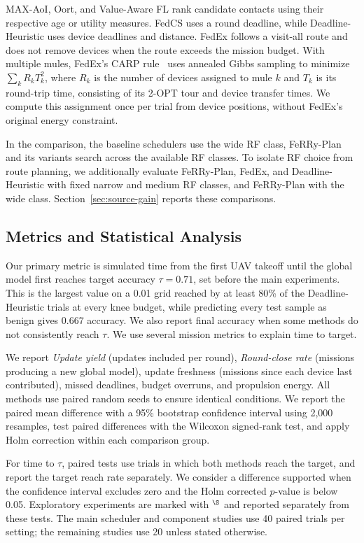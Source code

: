 \documentclass[conference]{IEEEtran}
\newcommand{\sysname}{FeRRy}
\begin{document}
MAX-AoI, Oort, and Value-Aware FL rank candidate
contacts using their respective age or utility measures. FedCS uses a round deadline, while Deadline-Heuristic uses device
deadlines and distance. FedEx follows a visit-all route
and does not remove devices when the route exceeds the mission budget. With multiple mules, FedEx's CARP
rule~\cite{bian2025indirect} uses annealed Gibbs sampling to minimize
\(\sum_k R_kT_k^2\), where \(R_k\) is the number of devices assigned to mule
\(k\) and \(T_k\) is its round-trip time, consisting of its 2-OPT tour and
device transfer times. We compute this assignment once per trial from
device positions, without FedEx's original energy
constraint.

In the comparison, the baseline schedulers use the wide RF class, \sysname{}-Plan and its variants search across the available RF
classes. To isolate RF choice from route planning, we additionally evaluate
\sysname{}-Plan, FedEx, and Deadline-Heuristic with fixed narrow and medium RF
classes, and \sysname{}-Plan with the wide class. Section~\ref{sec:source-gain}
reports these comparisons.

\subsection{Metrics and Statistical Analysis}
\label{sec:metrics}

Our primary metric is simulated time from the first UAV takeoff until the global model first reaches target accuracy \(\tau=0.71\), set before the main
experiments. This is the largest value on a 0.01 grid reached by at least 80\%
of the Deadline-Heuristic trials at every knee budget, while predicting every test sample as
benign gives 0.667 accuracy. We also
report final accuracy when some methods do not consistently reach
\(\tau\). We use several mission metrics to explain time to target.

We report \emph{Update yield}
(updates included per round), \emph{Round-close rate}
(missions producing a new global model), update freshness (missions since each device last contributed), missed deadlines, budget overruns, and propulsion energy. All methods  use paired random seeds to ensure identical conditions. We report the
paired mean difference with a 95\% bootstrap confidence interval
using 2,000 resamples, test paired differences with the Wilcoxon signed-rank test, and apply
Holm correction within each comparison group.

For time to \(\tau\), paired tests use trials in which both methods reach
the target, and report the target reach rate separately. We consider a
difference supported when the confidence interval excludes zero
and the Holm corrected \(p\)-value is below 0.05. Exploratory
experiments are marked with \(^{\S}\) and reported separately from these tests.
The main scheduler and component studies use 40 paired trials per setting; the
remaining studies use 20 unless stated otherwise.
\end{document}
